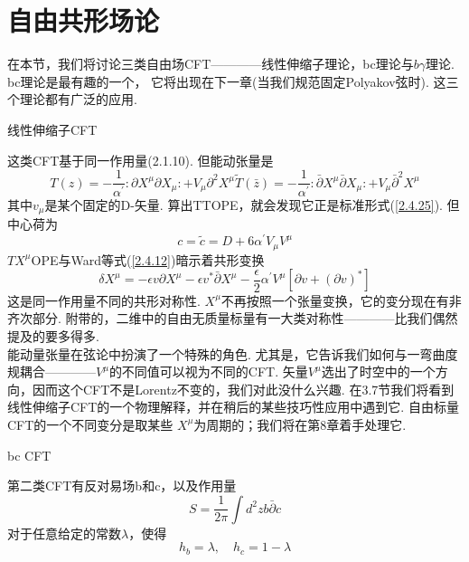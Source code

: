 \section{自由共形场论}%
在本节，我们将讨论三类自由场CFT————线性伸缩子理论，bc理论与$b\gamma$理论.  bc理论是最有趣的一个， 它将出现在下一章(当我们规范固定Polyakov弦时).  这三个理论都有广泛的应用.\\
\centerline{\Large 线性伸缩子CFT}
这类CFT基于同一作用量(2.1.10). 但能动张量是
\begin{subequations}
\begin{equation}
T(z)=-\frac{1}{\alpha^{\prime}}: \partial X^{\mu} \partial X_{\mu}:+V_{\mu} \partial^{2} X^{\mu}
\end{equation}
\begin{equation}
\tilde{T}(\bar{z})=-\frac{1}{\alpha^{\prime}}: \bar{\partial} X^{\mu} \bar{\partial} X_{\mu}:+V_{\mu} \bar{\partial}^{2} X^{\mu}
\end{equation}
\end{subequations}
其中$v_\mu$是某个固定的D-矢量. 算出TTOPE，就会发现它正是标准形式(\ref{2.4.25}). 但中心荷为
\begin{equation}
c=\tilde{c}=D+6 \alpha^{\prime} V_{\mu} V^{\mu}
\end{equation}
$TX^\mu $OPE与Ward等式(\ref{2.4.12})暗示着共形变换
\begin{equation}
\delta X^{\mu}=-\epsilon v \partial X^{\mu}-\epsilon v^{*} \bar{\partial} X^{\mu}-\frac{\epsilon}{2} \alpha^{\prime} V^{\mu}\left[\partial v+(\partial v)^{*}\right]
\end{equation}
这是同一作用量不同的共形对称性. $X^\mu$不再按照一个张量变换，它的变分现在有非齐次部分. 附带的，二维中的自由无质量标量有一大类对称性————比我们偶然提及的要多得多. \\
能动量张量在弦论中扮演了一个特殊的角色. 尤其是，它告诉我们如何与一弯曲度规耦合————$V^\mu$的不同值可以视为不同的CFT. 矢量$V^\mu$选出了时空中的一个方向，因而这个CFT不是Lorentz不变的，我们对此没什么兴趣. 在3.7节我们将看到线性伸缩子CFT的一个物理解释，并在稍后的某些技巧性应用中遇到它. 自由标量CFT的一个不同变分是取某些  $X^\mu$为周期的；我们将在第8章着手处理它.\\
\centerline{\Large bc CFT}
第二类CFT有反对易场b和c，以及作用量
\begin{equation}\label{2.5.4}
S=\frac{1}{2 \pi} \int d^{2} z b \bar{\partial} c
\end{equation}
对于任意给定的常数$\lambda$，使得
\begin{equation}
h_{b}=\lambda, \quad h_{c}=1-\lambda
\end{equation}

